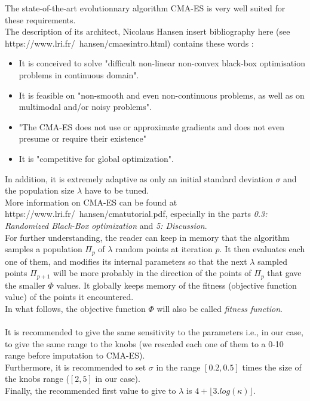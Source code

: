 The state-of-the-art evolutionnary algorithm CMA-ES is very well suited for these requirements.\\
The description of its architect, Nicolaus Hansen \color{blue}insert bibliography here\color{black} (see https://www.lri.fr/~hansen/cmaesintro.html) contains these words :
\begin{itemize}
	\item It is conceived to solve "difficult non-linear non-convex black-box optimisation problems in continuous domain". 
	\item It is feasible on "non-smooth and even non-continuous problems, as well as on multimodal and/or noisy problems".
	\item "The CMA-ES does not use or approximate gradients and does not even presume or require their existence"
	\item It is "competitive for global optimization".
\end{itemize}
In addition, it is extremely adaptive as only an initial standard deviation $\sigma$ and the population size $\lambda$ have to be tuned.\\
More information on CMA-ES can be found at https://www.lri.fr/~hansen/cmatutorial.pdf, especially in the parts \emph{0.3: Randomized Black-Box optimization} and \emph{5: Discussion}.\\
For further understanding, the reader can keep in memory that the algorithm samples a population $\Pi_{p}$ of $\lambda$ random points at iteration $p$. It then evaluates each one of them, and modifies its internal parameters so that the next $\lambda$ sampled points $\Pi_{p+1}$ will be more probably in the direction of the points of $\Pi_{p}$ that gave the smaller $\Phi$ values. It globally keeps memory of the fitness (objective function value) of the points it encountered.\\
In what follows, the objective function $\Phi$ will also be called \emph{fitness function}.\\
\\
It is recommended to give the same sensitivity to the parameters i.e., in our case, to give the same range to the knobs (we rescaled each one of them to a 0-10 range before imputation to CMA-ES).\\
Furthermore, it is recommended to set $\sigma$ in the range $[0.2,0.5]$ times the size of the knobs range ($[2,5]$ in our case).\\
Finally, the recommended first value to give to $\lambda$ is $4+\lfloor3.log(\kappa)\rfloor$.


